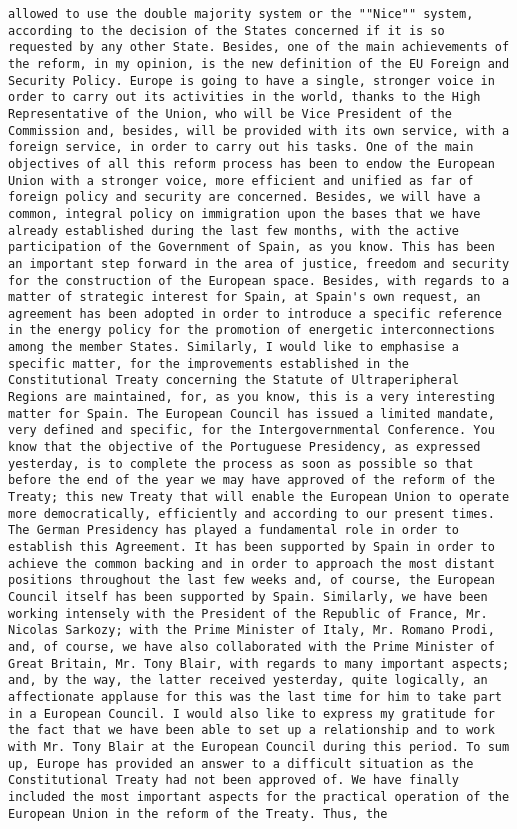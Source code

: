 \documentclass[
]{article}
\begin{document}
\begin{verbatim}
allowed to use the double majority system or the ""Nice"" system, according to the decision of the States concerned if it is so requested by any other State. Besides, one of the main achievements of the reform, in my opinion, is the new definition of the EU Foreign and Security Policy. Europe is going to have a single, stronger voice in order to carry out its activities in the world, thanks to the High Representative of the Union, who will be Vice President of the Commission and, besides, will be provided with its own service, with a foreign service, in order to carry out his tasks. One of the main objectives of all this reform process has been to endow the European Union with a stronger voice, more efficient and unified as far of foreign policy and security are concerned. Besides, we will have a common, integral policy on immigration upon the bases that we have already established during the last few months, with the active participation of the Government of Spain, as you know. This has been an important step forward in the area of justice, freedom and security for the construction of the European space. Besides, with regards to a matter of strategic interest for Spain, at Spain's own request, an agreement has been adopted in order to introduce a specific reference in the energy policy for the promotion of energetic interconnections among the member States. Similarly, I would like to emphasise a specific matter, for the improvements established in the Constitutional Treaty concerning the Statute of Ultraperipheral Regions are maintained, for, as you know, this is a very interesting matter for Spain. The European Council has issued a limited mandate, very defined and specific, for the Intergovernmental Conference. You know that the objective of the Portuguese Presidency, as expressed yesterday, is to complete the process as soon as possible so that before the end of the year we may have approved of the reform of the Treaty; this new Treaty that will enable the European Union to operate more democratically, efficiently and according to our present times. The German Presidency has played a fundamental role in order to establish this Agreement. It has been supported by Spain in order to achieve the common backing and in order to approach the most distant positions throughout the last few weeks and, of course, the European Council itself has been supported by Spain. Similarly, we have been working intensely with the President of the Republic of France, Mr. Nicolas Sarkozy; with the Prime Minister of Italy, Mr. Romano Prodi, and, of course, we have also collaborated with the Prime Minister of Great Britain, Mr. Tony Blair, with regards to many important aspects; and, by the way, the latter received yesterday, quite logically, an affectionate applause for this was the last time for him to take part in a European Council. I would also like to express my gratitude for the fact that we have been able to set up a relationship and to work with Mr. Tony Blair at the European Council during this period. To sum up, Europe has provided an answer to a difficult situation as the Constitutional Treaty had not been approved of. We have finally included the most important aspects for the practical operation of the European Union in the reform of the Treaty. Thus, the 
\end{verbatim}
\end{document}

